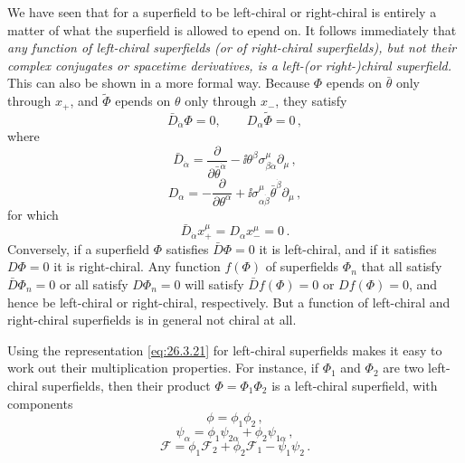 We have seen that for a superfield to be left-chiral or right-chiral is
entirely a matter of what the superfield is allowed to \dd epend on. It follows
immediately that \emph{any function of left-chiral superfields (or of
right-chiral superfields), but not their complex conjugates or spacetime
derivatives, is a left-(or right-)chiral superfield.} This can also be shown in
a more formal way. Because \(\Phi\) \dd epends on \(\bar\theta\) only through
\(x_+\), and \(\widetilde{\Phi}\) \dd epends on \(\theta\) only through
\(x_-\), they satisfy
\begin{equation}
  \bar D_{\dot\alpha}\Phi=0,\qquad
  D_\alpha\widetilde{\Phi}=0\,,
  \tag{26.3.24}\label{eq:26.3.24}
\end{equation}
where
\begin{equation}
  \bar D_{\dot\alpha}
  =\frac{\partial}{\partial\bar\theta^{\dot\alpha}}
  -\ii\theta^\beta\sigma^\mu_{\beta\dot\alpha}\partial_\mu\,,
  \tag{26.3.25}\label{eq:26.3.25}
\end{equation}
\begin{equation}
  D_\alpha
  =-\frac{\partial}{\partial\theta^\alpha}
  +\ii\sigma^\mu_{\alpha\dot\beta}\bar\theta^{\dot\beta}\partial_\mu\,,
  \tag{26.3.26}\label{eq:26.3.26}
\end{equation}
for which
\[
  \bar D_{\dot\alpha}x_+^\mu
  =D_\alpha x_-^\mu=0\,.
\]
Conversely, if a superfield \(\Phi\) satisfies \(\bar D\Phi=0\) it is
left-chiral, and if it satisfies \(D\Phi=0\) it is right-chiral. Any
function $f(\Phi)$ of superfields $\Phi_n$ that all satisfy
\(\bar D\Phi_n=0\) or all satisfy \(D\Phi_n=0\) will satisfy
\(\bar Df(\Phi)=0\) or \(Df(\Phi)=0\), and hence be left-chiral or
right-chiral, respectively. But a function of left-chiral and right-chiral
superfields is in general not chiral at all.

Using the representation \eqref{eq:26.3.21} for left-chiral superfields makes
it easy to work out their multiplication properties. For instance, if
$\Phi_1$ and $\Phi_2$ are two left-chiral superfields, then their product
$\Phi=\Phi_1\Phi_2$ is a left-chiral superfield, with components
\begin{equation}
  \phi=\phi_1\phi_2\,,
  \tag{26.3.27}\label{eq:26.3.27}
\end{equation}
\begin{equation}
  \psi_\alpha=\phi_1\psi_{2\alpha}+\phi_2\psi_{1\alpha}\,,
  \tag{26.3.28}\label{eq:26.3.28}
\end{equation}
\begin{equation}
  \mathcal{F}
  =\phi_1\mathcal{F}_2+\phi_2\mathcal{F}_1
  -\psi_1\psi_2\,.
  \tag{26.3.29}\label{eq:26.3.29}
\end{equation}

